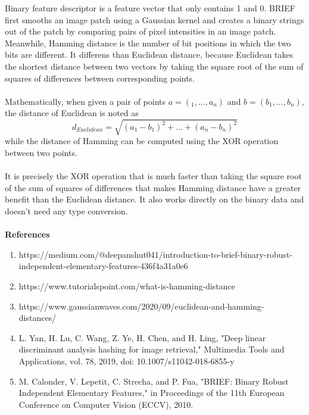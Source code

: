 \documentclass[12pt,letterpaper, onecolumn]{exam}
\begin{document}
\begin{questions}
    \begin{solution}
        Binary feature descriptor is a feature vector that only contains 1 and 0. BRIEF first smooths an image patch using a Gaussian kernel and creates a binary strings out of the patch by comparing pairs of pixel intensities in an image patch. Meanwhile, Hamming distance is the number of bit positions in which the two bits are different. It differens than Euclidean distance, because Euclidean takes the shortest distance between two vectors by taking the square root of the sum of squares of differences between corresponding points. \\~\\
        Mathematically, when given a pair of points \(a = (_1, \dots, a_n)\) and \(b = (b_1, \dots, b_n)\), the distance of Euclidean is noted as
        \[
            d_{Euclidean} = \sqrt{(a_1 - b_1)^2 + \dots + (a_n - b_n)^2}
        \]
        while the distance of Hamming can be computed using the XOR operation between two points.\\~\\
        It is precisely the XOR operation that is much faster than taking the square root of the sum of squares of differences that makes Hamming distance have a greater benefit than the Euclidean distance. It also works directly on the binary data and doesn't need any type conversion.
        \\~\\
        \textbf{References}
        \begin{enumerate}
            \item https://medium.com/@deepanshut041/introduction-to-brief-binary-robust-independent-elementary-features-436f4a31a0e6
            \item https://www.tutorialspoint.com/what-is-hamming-distance
            \item https://www.gaussianwaves.com/2020/09/euclidean-and-hamming-\\distances/
            \item L. Yan, H. Lu, C. Wang, Z. Ye, H. Chen, and H. Ling, "Deep linear discriminant analysis hashing for image retrieval," Multimedia Tools and Applications, vol. 78, 2019, doi: 10.1007/s11042-018-6855-y 
            \item M. Calonder, V. Lepetit, C. Strecha, and P. Fua, "BRIEF: Binary Robust Independent Elementary Features," in Proceedings of the 11th European Conference on Computer Vision (ECCV), 2010.
        \end{enumerate}
    \end{solution}


\end{questions}
\end{document}
